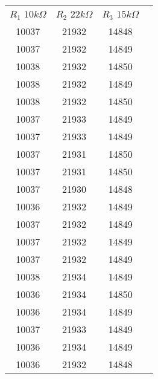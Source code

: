 \documentclass[12pt,twoside, a4paper, twocolumn]{article}
\begin{document}
\begin{center}
    \begin{tabular}{ |c|c|c|c| }
        \hline
        $R_1$ $10k\varOmega$ & $R_2$ $22k\varOmega$ & $R_3$ $15k\varOmega$ & \\
        10037                & 21932                & 14848                  \\
        10037                & 21932                & 14849                  \\
        10038                & 21932                & 14850                  \\
        10038                & 21932                & 14849                  \\
        10038                & 21932                & 14850                  \\
        10037                & 21933                & 14849                  \\
        10037                & 21933                & 14849                  \\
        10037                & 21931                & 14850                  \\
        10037                & 21931                & 14850                  \\
        10037                & 21930                & 14848                  \\
        10036                & 21932                & 14849                  \\
        10037                & 21932                & 14849                  \\
        10037                & 21932                & 14849                  \\
        10037                & 21932                & 14849                  \\
        10038                & 21934                & 14849                  \\
        10036                & 21934                & 14850                  \\
        10036                & 21934                & 14849                  \\
        10037                & 21933                & 14849                  \\
        10036                & 21934                & 14849                  \\
        10036                & 21932                & 14848                  \\

        \hline
    \end{tabular}
\end{center}
\end{document}
